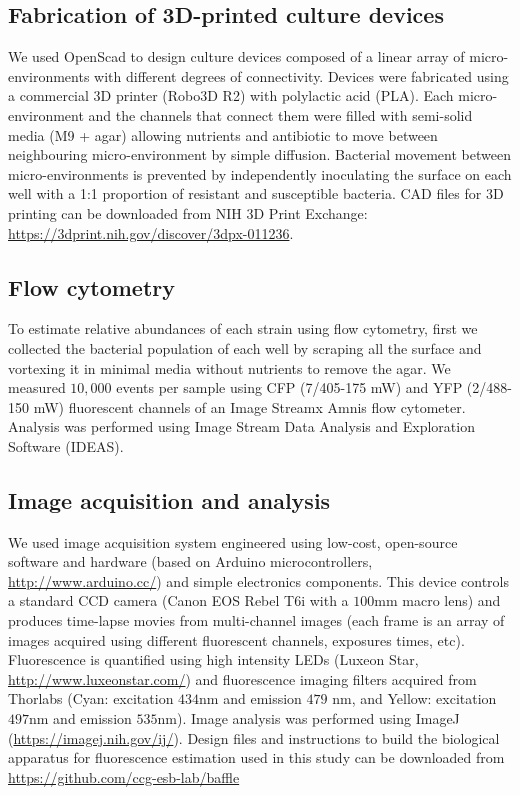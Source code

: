 \documentclass[fleqn,12pt]{wlscirep}
\begin{document}
\subsection*{Fabrication of 3D-printed culture devices}

We used OpenScad to design culture devices composed of a linear array of micro-environments with different degrees of connectivity. Devices were fabricated using a commercial 3D printer (Robo3D R2) with polylactic acid (PLA). Each micro-environment and the channels that connect them were filled with semi-solid media (M9 + agar) allowing nutrients and antibiotic to move between neighbouring micro-environment by simple diffusion. Bacterial movement between micro-environments is prevented by independently inoculating the surface on each well with a 1:1 proportion of resistant and susceptible bacteria. CAD files for 3D printing can be downloaded from NIH 3D Print Exchange: \href{https://3dprint.nih.gov/discover/3dpx-011236}{https://3dprint.nih.gov/discover/3dpx-011236}.

\subsection*{Flow cytometry}

To estimate relative abundances of each strain using flow cytometry, first we collected the bacterial population of each well by scraping all the surface and vortexing it in minimal media without nutrients to remove the agar.  We measured $10,000$ events per sample using CFP (7/405-175 mW) and YFP (2/488-150 mW) fluorescent channels of an Image Streamx Amnis flow cytometer. Analysis was performed using Image Stream Data Analysis and Exploration Software (IDEAS).

\subsection*{Image acquisition and analysis}

We used image acquisition system engineered using low-cost, open-source software and hardware (based on Arduino microcontrollers, \href{http://www.arduino.cc/}{http://www.arduino.cc/}) and simple electronics components. This device controls a standard CCD camera (Canon EOS Rebel T6i with a $100$mm macro lens) and produces time-lapse movies from multi-channel images (each frame is an array of images acquired using different fluorescent channels, exposures times, etc). Fluorescence is quantified using high intensity LEDs (Luxeon Star, \href{http://www.luxeonstar.com/}{http://www.luxeonstar.com/}) and fluorescence imaging filters acquired from Thorlabs (Cyan: excitation $434 $nm and emission $479$ nm, and Yellow: excitation $497 $nm and emission $535$nm). Image analysis was performed using ImageJ (\href{https://imagej.nih.gov/ij/}{https://imagej.nih.gov/ij/}).  Design files and instructions to build the biological apparatus for fluorescence estimation used in this study can be downloaded from \href{https://github.com/ccg-esb-lab/baffle}{https://github.com/ccg-esb-lab/baffle}
\end{document}
